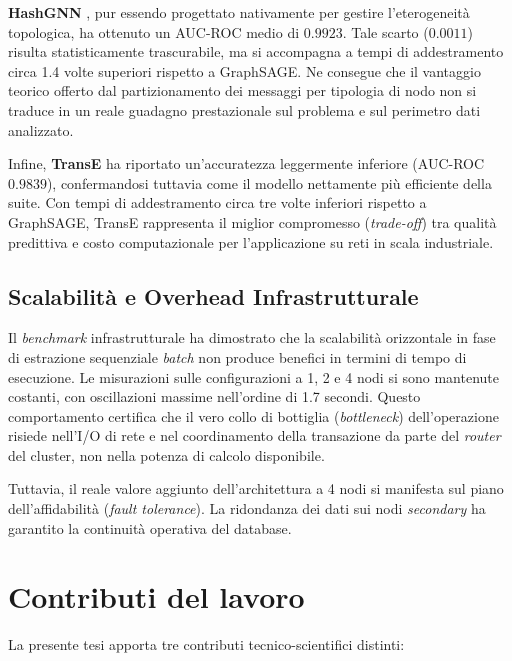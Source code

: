 \textbf{HashGNN} \cite{neo4j_hashgnn}, pur essendo progettato nativamente per gestire l'eterogeneità topologica, ha ottenuto un AUC-ROC medio di $0.9923$. Tale scarto ($0.0011$) risulta statisticamente trascurabile, ma si accompagna a tempi di addestramento circa 1.4 volte superiori rispetto a GraphSAGE. Ne consegue che il vantaggio teorico offerto dal partizionamento dei messaggi per tipologia di nodo non si traduce in un reale guadagno prestazionale sul problema e sul perimetro dati analizzato.

Infine, \textbf{TransE} \cite{bordes2013translating} ha riportato un'accuratezza leggermente inferiore (AUC-ROC $0.9839$), confermandosi tuttavia come il modello nettamente più efficiente della suite. Con tempi di addestramento circa tre volte inferiori rispetto a GraphSAGE, TransE rappresenta il miglior compromesso (\textit{trade-off}) tra qualità predittiva e costo computazionale per l'applicazione su reti in scala industriale.

\subsection{Scalabilità e Overhead Infrastrutturale}
Il \textit{benchmark} infrastrutturale ha dimostrato che la scalabilità orizzontale in fase di estrazione sequenziale \textit{batch} non produce benefici in termini di tempo di esecuzione. Le misurazioni sulle configurazioni a 1, 2 e 4 nodi si sono mantenute costanti, con oscillazioni massime nell'ordine di 1.7 secondi. Questo comportamento certifica che il vero collo di bottiglia (\textit{bottleneck}) dell'operazione risiede nell'I/O di rete e nel coordinamento della transazione da parte del \textit{router} del cluster, non nella potenza di calcolo disponibile.

Tuttavia, il reale valore aggiunto dell'architettura a 4 nodi si manifesta sul piano dell'affidabilità (\textit{fault tolerance}). La ridondanza dei dati sui nodi \textit{secondary} ha garantito la continuità operativa del database.

\section{Contributi del lavoro}
La presente tesi apporta tre contributi tecnico-scientifici distinti:

